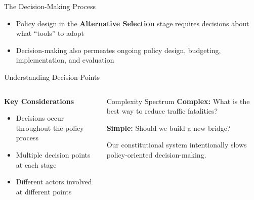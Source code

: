 \documentclass[10pt]{beamer}
\begin{document}
\begin{frame}{The Decision-Making Process}
\begin{center}
\end{center}

\vspace{1cm}
\begin{itemize}
\item Policy design in the \textcolor{titanorange}{\textbf{Alternative Selection}} stage requires decisions about what ``tools'' to adopt
\item Decision-making also permeates ongoing policy design, budgeting, implementation, and evaluation
\end{itemize}
\end{frame}

\begin{frame}{Understanding Decision Points}
\begin{columns}
\begin{column}{0.5\textwidth}
\textbf{Key Considerations}
\begin{itemize}
\item Decisions occur throughout the policy process
\item Multiple decision points at each stage
\item Different actors involved at different points
\end{itemize}
\end{column}
\begin{column}{0.5\textwidth}
\begin{block}{Complexity Spectrum}
\textbf{Complex:} What is the best way to reduce traffic fatalities?

\vspace{0.3cm}
\textbf{Simple:} Should we build a new bridge?
\end{block}

\vspace{0.3cm}
\small{Our constitutional system intentionally slows policy-oriented decision-making.}
\end{column}
\end{columns}
\end{frame}
\end{document}
